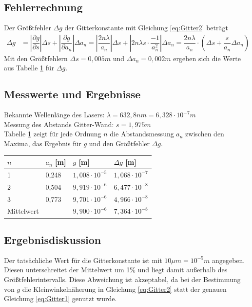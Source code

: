\documentclass{scrartcl}
\begin{document}
\subsection{Fehlerrechnung}
Der Größtfehler $\Delta g$ der Gitterkonstante mit Gleichung \ref{eq:Gitter2} beträgt
\begin{align*}
\Delta g & = \left| \dfrac{\partial g}{\partial s} \right| \Delta s + \left| \dfrac{\partial g}{\partial a_{n}} \right| \Delta a_{n} = \left| \dfrac{2n \lambda}{a_{n}} \right| \Delta s + \left| 2n \lambda s \cdot \dfrac{-1}{a_{n}^{2}} \right| \Delta a_{n} = \dfrac{2n \lambda}{a_{n}} \cdot \left( \Delta s + \dfrac{s}{a_{n}} \Delta a_{n} \right)
\end{align*}
Mit den Größtfehlern $\Delta s = 0,005m$ und $\Delta a_{n} = 0,002m$ ergeben sich  die Werte aus Tabelle \ref{tab:Gitter} für $\Delta g$.
\subsection{Messwerte und Ergebnisse}
Bekannte Wellenlänge des Lasers: $\lambda = 632,8nm = 6,328 \cdot 10^{-7}m$ \\
Messung des Abstands Gitter-Wand: $s = 1,975m$ \\
Tabelle \ref{tab:Gitter} zeigt für jede Ordnung $n$ die Abstandsmessung $a_{n}$ zwischen den Maxima, das Ergebnis für $g$ und den Größtfehler $\Delta g$.
\begin{table}[H]
\begin{center}
\begin{tabular}{l|l|l|l}
$n$    & $a_{n}$ {[}m{]} & $g$ {[}m{]} & $\Delta g$ {[}m{]}\\
\hline
1          & 0,248       & $1,008 \cdot 10^{-5}$ & $1,068 \cdot 10^{-7}$ \\
2          & 0,504       & $9,919 \cdot 10^{-6}$ & $6,477 \cdot 10^{-8}$ \\
3          & 0,773       & $9,701 \cdot 10^{-6}$ & $4,966 \cdot 10^{-8}$ \\
\hline
Mittelwert &             & $9,900 \cdot 10^{-6}$ & $7,364 \cdot 10^{-8}$
\end{tabular}
\end{center}
\label{tab:Gitter}
\end{table}

\subsection{Ergebnisdiskussion}
Der tatsächliche Wert für die Gitterkonstante ist mit $10 \mu m = 10^{-5} m$ angegeben. Diesen unterschreitet der Mittelwert um 1\% und liegt damit außerhalb des Größtfehlerintervalls. Diese Abweichung ist akzeptabel, da bei der Bestimmung von $g$ die Kleinwinkelnäherung in Gleichung \ref{eq:Gitter2} statt der genauen Gleichung \ref{eq:Gitter1} genutzt wurde.
\end{document}
